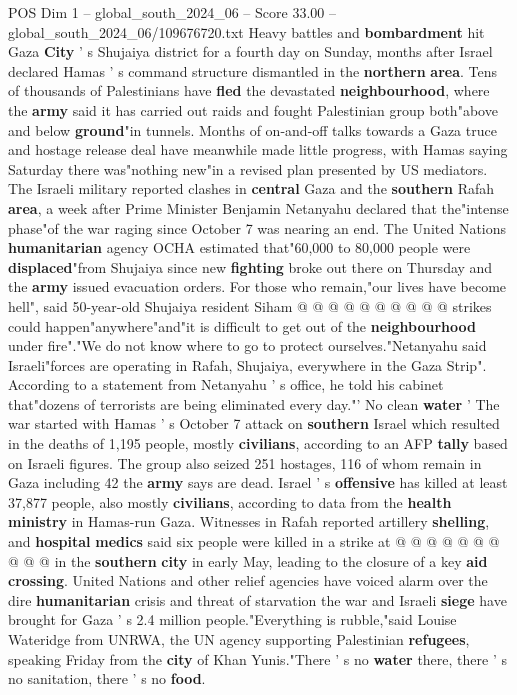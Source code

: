 \begin{textsample}{POS Dim 1 – global\_south\_2024\_06 – Score 33.00 – global\_south\_2024\_06/109676720.txt}  \label{ex:f1_pos_045}
Heavy battles and \textbf{bombardment} hit Gaza \textbf{City} ' s Shujaiya district for a fourth day on Sunday, months after Israel declared Hamas ' s command structure dismantled in the \textbf{northern} \textbf{area}.
Tens of thousands of Palestinians have \textbf{fled} the devastated \textbf{neighbourhood}, where the \textbf{army} said it has carried out raids and fought Palestinian group both"above and below \textbf{ground}"in tunnels.
Months of on-and-off talks towards a Gaza truce and hostage release deal have meanwhile made little progress, with Hamas saying Saturday there was"nothing new"in a revised plan presented by US mediators.
The Israeli military reported clashes in \textbf{central} Gaza and the \textbf{southern} Rafah \textbf{area}, a week after Prime Minister Benjamin Netanyahu declared that the"intense phase"of the war raging since October 7 was nearing an end.
The United Nations \textbf{humanitarian} agency OCHA estimated that"60,000 to 80,000 people were \textbf{displaced}"from Shujaiya since new \textbf{fighting} broke out there on Thursday and the \textbf{army} issued evacuation orders.
For those who remain,"our lives have become hell", said 50-year-old Shujaiya resident Siham @ @ @ @ @ @ @ @ @ @ strikes could happen"anywhere"and"it is difficult to get out of the \textbf{neighbourhood} under fire"."We do not know where to go to protect ourselves."Netanyahu said Israeli"forces are operating in Rafah, Shujaiya, everywhere in the Gaza Strip".
According to a statement from Netanyahu ' s office, he told his cabinet that"dozens of terrorists are being eliminated every day."' No clean \textbf{water} ' The war started with Hamas ' s October 7 attack on \textbf{southern} Israel which resulted in the deaths of 1,195 people, mostly \textbf{civilians}, according to an AFP \textbf{tally} based on Israeli figures.
The group also seized 251 hostages, 116 of whom remain in Gaza including 42 the \textbf{army} says are dead.
Israel ' s \textbf{offensive} has killed at least 37,877 people, also mostly \textbf{civilians}, according to data from the \textbf{health} \textbf{ministry} in Hamas-run Gaza.
Witnesses in Rafah reported artillery \textbf{shelling}, and \textbf{hospital} \textbf{medics} said six people were killed in a strike at @ @ @ @ @ @ @ @ @ @ in the \textbf{southern} \textbf{city} in early May, leading to the closure of a key \textbf{aid} \textbf{crossing}.
United Nations and other relief agencies have voiced alarm over the dire \textbf{humanitarian} crisis and threat of starvation the war and Israeli \textbf{siege} have brought for Gaza ' s 2.4 million people."Everything is rubble,"said Louise Wateridge from UNRWA, the UN agency supporting Palestinian \textbf{refugees}, speaking Friday from the \textbf{city} of Khan Yunis."There ' s no \textbf{water} there, there ' s no sanitation, there ' s no \textbf{food}.

\end{textsample}
